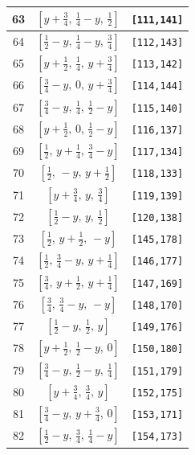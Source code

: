\documentclass[fleqn,8pt]{jsarticle}
\begin{document}
\begin{longtable}{ccc}
63 & $\left[ y + \frac{3}{4},\, \frac{1}{4} - y,\, \frac{1}{2} \right]$ & {\tt [111,141]} \\ \hline
64 & $\left[ \frac{1}{2} - y,\, \frac{1}{4} - y,\, \frac{3}{4} \right]$ & {\tt [112,143]} \\ \hline
65 & $\left[ y + \frac{1}{2},\, \frac{1}{4},\, y + \frac{3}{4} \right]$ & {\tt [113,142]} \\ \hline
66 & $\left[ \frac{3}{4} - y,\, 0,\, y + \frac{3}{4} \right]$ & {\tt [114,144]} \\ \hline
67 & $\left[ \frac{3}{4} - y,\, \frac{1}{4},\, \frac{1}{2} - y \right]$ & {\tt [115,140]} \\ \hline
68 & $\left[ y + \frac{1}{2},\, 0,\, \frac{1}{2} - y \right]$ & {\tt [116,137]} \\ \hline
69 & $\left[ \frac{1}{2},\, y + \frac{1}{4},\, \frac{3}{4} - y \right]$ & {\tt [117,134]} \\ \hline
70 & $\left[ \frac{1}{2},\, - y,\, y + \frac{1}{2} \right]$ & {\tt [118,133]} \\ \hline
71 & $\left[ y + \frac{3}{4},\, y,\, \frac{3}{4} \right]$ & {\tt [119,139]} \\ \hline
72 & $\left[ \frac{1}{2} - y,\, y,\, \frac{1}{2} \right]$ & {\tt [120,138]} \\ \hline
73 & $\left[ \frac{1}{2},\, y + \frac{1}{2},\, - y \right]$ & {\tt [145,178]} \\ \hline
74 & $\left[ \frac{1}{2},\, \frac{3}{4} - y,\, y + \frac{1}{4} \right]$ & {\tt [146,177]} \\ \hline
75 & $\left[ \frac{3}{4},\, y + \frac{1}{2},\, y + \frac{1}{4} \right]$ & {\tt [147,169]} \\ \hline
76 & $\left[ \frac{3}{4},\, \frac{3}{4} - y,\, - y \right]$ & {\tt [148,170]} \\ \hline
77 & $\left[ \frac{1}{2} - y,\, \frac{1}{2},\, y \right]$ & {\tt [149,176]} \\ \hline
78 & $\left[ y + \frac{1}{2},\, \frac{1}{2} - y,\, 0 \right]$ & {\tt [150,180]} \\ \hline
79 & $\left[ \frac{3}{4} - y,\, \frac{1}{2} - y,\, \frac{1}{4} \right]$ & {\tt [151,179]} \\ \hline
80 & $\left[ y + \frac{3}{4},\, \frac{3}{4},\, y \right]$ & {\tt [152,175]} \\ \hline
81 & $\left[ \frac{3}{4} - y,\, y + \frac{3}{4},\, 0 \right]$ & {\tt [153,171]} \\ \hline
82 & $\left[ \frac{1}{2} - y,\, \frac{3}{4},\, \frac{1}{4} - y \right]$ & {\tt [154,173]} \\ \hline

\end{longtable}
\end{document}
